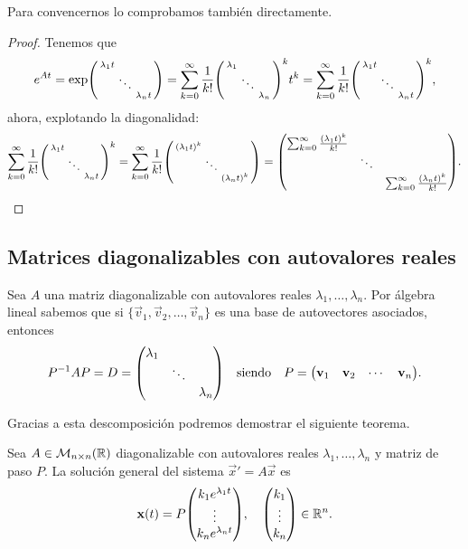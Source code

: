 \documentclass[../ecuaciones_diferenciales.tex]{subfiles}
\begin{document}
Para convencernos lo comprobamos también directamente.

\begin{proof}
	Tenemos que
	\[e^{At} = \exp\smat{\lambda_1 t & & \\ & \ddots & \\ & & \lambda_n t}
		= \sum_{k = 0}^\infty
		\frac{1}{k!}\smat{\lambda_1 & & \\ & \ddots & \\ & & \lambda_n}^k t^k
		= \sum_{k = 0}^\infty
		\frac{1}{k!} \smat{\lambda_1 t & & \\ & \ddots & \\ & & \lambda_n t}^k,
	\]
	ahora, explotando la diagonalidad:
	\[\sum_{k = 0}^\infty \frac{1}{k!} 
			\smat{\lambda_1 t & & \\ & \ddots & \\ & & \lambda_n t}^k
		= \sum_{k = 0}^\infty \frac{1}{k!} 
			\smat{{(\lambda_1 t)}^k & & \\ & \ddots & \\ & & {(\lambda_n t)}^k}
		= \mat{\sum_{k = 0}^\infty \frac{{(\lambda_1 t)}^k}{k!} & & \\
			& \ddots &
			\\ & & \sum_{k = 0}^\infty \frac{{(\lambda_n t)}^k}{k!}}.\]
\end{proof}

\subsection{Matrices diagonalizables con autovalores reales}

Sea \(A\) una matriz diagonalizable con autovalores reales
\(\lambda_1, \dots, \lambda_n\). 
Por álgebra lineal sabemos que si \(\{\vec{v}_1, \vec{v}_2, \dots, \vec{v}_n\}\)
es una base de autovectores asociados, entonces
\[P^{-1} A P = D = \mat{\lambda_1 && \\ & \ddots & \\ && \lambda_n}
	\quad \text{siendo} \quad
	P = \mat{\vec{v}_1 & \vec{v}_2 & \cdots & \vec{v}_n}.\]

Gracias a esta descomposición podremos demostrar el siguiente teorema.

\begin{proposition}
    Sea \(A \in \mathcal{M}_{n \times n}(\mathbb{R})\) diagonalizable con autovalores
    reales \(\lambda_1, \dots, \lambda_n\) y matriz de paso \(P\). La
    solución general del sistema \(\vec{x}' = A\vec{x}\) es
	\[\vec{x}(t) = P\mat{k_1 e^{\lambda_1 t} \\ \vdots \\ k_n e^{\lambda_n t}},
	\quad \mat{k_1 \\ \vdots \\ k_n} \in \R^n.\]
\end{proposition}
\end{document}
